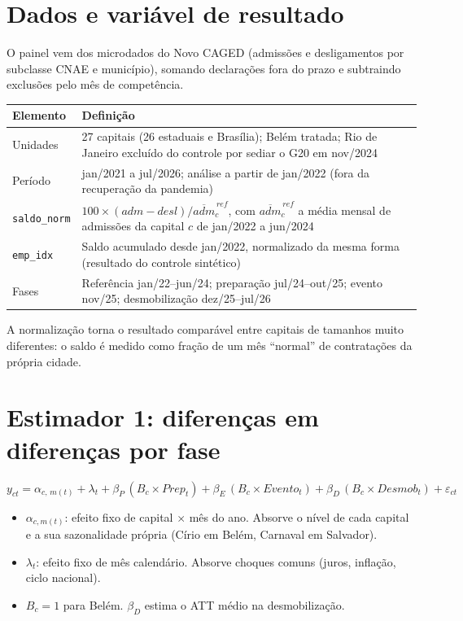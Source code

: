 \documentclass[11pt,a4paper]{article}
\newcommand{\var}[1]{\texttt{#1}}
\begin{document}
\section{Dados e variável de resultado}

O painel vem dos microdados do Novo CAGED (admissões e desligamentos por subclasse CNAE e município),
somando declarações fora do prazo e subtraindo exclusões pelo mês de competência.

\begin{table}[H]
\centering\small
\begin{tabularx}{\linewidth}{p{2.6cm}L}
\toprule
\textbf{Elemento} & \textbf{Definição}\\
\midrule
Unidades & 27 capitais (26 estaduais e Brasília); Belém tratada; Rio de Janeiro excluído do controle por sediar o G20 em nov/2024\\
Período & jan/2021 a jul/2026; análise a partir de jan/2022 (fora da recuperação da pandemia)\\
\var{saldo\_norm} & $100 \times (adm - desl)/\overline{adm}^{\,ref}_c$, com $\overline{adm}^{\,ref}_c$ a média mensal de admissões da capital $c$ de jan/2022 a jun/2024\\
\var{emp\_idx} & Saldo acumulado desde jan/2022, normalizado da mesma forma (resultado do controle sintético)\\
Fases & Referência jan/22--jun/24; preparação jul/24--out/25; evento nov/25; desmobilização dez/25--jul/26\\
\bottomrule
\end{tabularx}
\end{table}

A normalização torna o resultado comparável entre capitais de tamanhos muito diferentes: o saldo é
medido como fração de um mês ``normal'' de contratações da própria cidade.

\section{Estimador 1: diferenças em diferenças por fase}

\begin{equation}
y_{ct} = \alpha_{c,\,m(t)} + \lambda_t + \beta_P\,(B_c \times Prep_t) + \beta_E\,(B_c \times Evento_t)
       + \beta_D\,(B_c \times Desmob_t) + \varepsilon_{ct}
\end{equation}

\begin{itemize}
  \item $\alpha_{c,m(t)}$: efeito fixo de capital $\times$ mês do ano. Absorve o nível de cada capital e
        a sua sazonalidade própria (Círio em Belém, Carnaval em Salvador).
  \item $\lambda_t$: efeito fixo de mês calendário. Absorve choques comuns (juros, inflação, ciclo nacional).
  \item $B_c = 1$ para Belém. $\beta_D$ estima o ATT médio na desmobilização.
\end{itemize}
\end{document}
